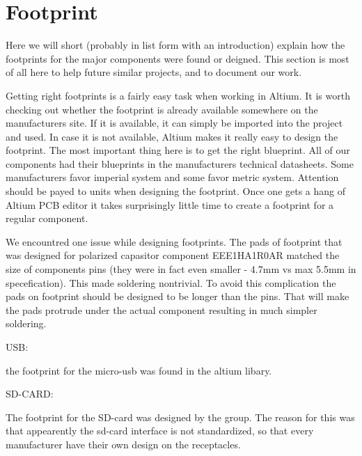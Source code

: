 \section {Footprint}

Here we will short (probably in list form with an introduction) explain how the footprints for the major components were found or deigned.
This section is most of all here to help future similar projects, and to document our work.

Getting right footprints is a fairly easy task when working in Altium.
It is worth checking out whether the footprint is already available somewhere on the manufacturers site.
If it is available, it can simply be imported into the project and used.
In case it is not available, Altium makes it really easy to design the footprint.
The most important thing here is to get the right blueprint.
All of our components had their blueprints in the manufacturers technical datasheets.
Some manufacturers favor imperial system and some favor metric system.
Attention should be payed to units when designing the footprint.
Once one gets a hang of Altium PCB editor it takes surprisingly little time to create a footprint for a regular component.

We encountred one issue while designing footprints.
The pads of footprint that was designed for polarized capasitor component EEE1HA1R0AR matched the size of components pins (they were in fact even smaller - 4.7mm vs max 5.5mm in specefication). 
This made soldering nontrivial.
To avoid this complication the pads on footprint should be designed to be longer than the pins.
That will make the pads protrude under the actual component resulting in much simpler soldering.

USB:

the footprint for the micro-usb was found in the altium libary. 



SD-CARD:

The footprint for the SD-card was designed by the group. The reason for this was that appearently the sd-card interface is not standardized, so that 
every manufacturer have their own design on the receptacles. 



